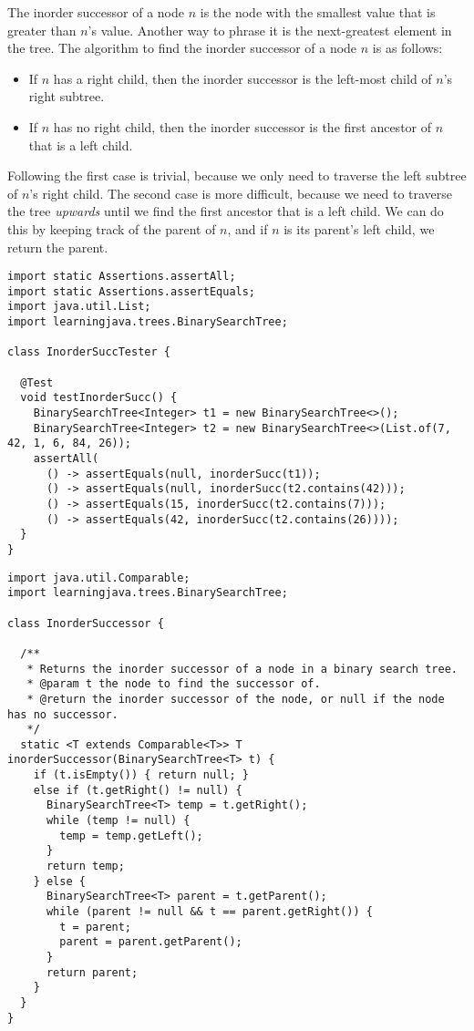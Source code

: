 The inorder successor of a node $n$ is the node with the smallest value that is greater than $n$'s value. 
Another way to phrase it is the next-greatest element in the tree.
The algorithm to find the inorder successor of a node $n$ is as follows:
\begin{itemize}
  \item If $n$ has a right child, then the inorder successor is the left-most child of $n$'s right subtree.
  \item If $n$ has no right child, then the inorder successor is the first ancestor of $n$ that is a left child.
\end{itemize}
Following the first case is trivial, because we only need to traverse the left subtree of $n$'s right child. 
The second case is more difficult, because we need to traverse the tree \emph{upwards} until we find the first ancestor that is a left child. 
We can do this by keeping track of the parent of $n$, and if $n$ is its parent's left child, we return the parent.

\begin{lstlisting}[language=MyJava]
import static Assertions.assertAll;
import static Assertions.assertEquals;
import java.util.List;
import learningjava.trees.BinarySearchTree;

class InorderSuccTester {

  @Test
  void testInorderSucc() {
    BinarySearchTree<Integer> t1 = new BinarySearchTree<>();
    BinarySearchTree<Integer> t2 = new BinarySearchTree<>(List.of(7, 42, 1, 6, 84, 26));
    assertAll(
      () -> assertEquals(null, inorderSucc(t1));
      () -> assertEquals(null, inorderSucc(t2.contains(42)));
      () -> assertEquals(15, inorderSucc(t2.contains(7)));
      () -> assertEquals(42, inorderSucc(t2.contains(26))));
  }
}
\end{lstlisting}

\begin{lstlisting}[language=MyJava]
import java.util.Comparable;
import learningjava.trees.BinarySearchTree;

class InorderSuccessor {

  /**
   * Returns the inorder successor of a node in a binary search tree.
   * @param t the node to find the successor of.
   * @return the inorder successor of the node, or null if the node has no successor.
   */
  static <T extends Comparable<T>> T inorderSuccessor(BinarySearchTree<T> t) {
    if (t.isEmpty()) { return null; } 
    else if (t.getRight() != null) {
      BinarySearchTree<T> temp = t.getRight();
      while (temp != null) {
        temp = temp.getLeft();
      }
      return temp;
    } else {
      BinarySearchTree<T> parent = t.getParent();
      while (parent != null && t == parent.getRight()) {
        t = parent;
        parent = parent.getParent();
      }
      return parent;
    }
  }
}
\end{lstlisting}

